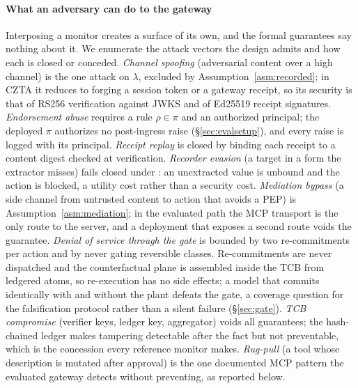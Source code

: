 \paragraph*{What an adversary can do to the gateway}
Interposing a monitor creates a surface of its own, and the formal
guarantees say nothing about it. We enumerate the attack vectors the
design admits and how each is closed or conceded.
\emph{Channel spoofing} (adversarial content over a high channel) is
the one attack on $\lambda$, excluded by Assumption~\ref{asm:recorded};
in CZTA it reduces to forging a session token or a gateway receipt, so
its security is that of RS256 verification against JWKS and of Ed25519
receipt signatures. \emph{Endorsement abuse} requires a rule
$\rho \in \pi$ and an authorized principal; the deployed $\pi$
authorizes no post-ingress raise (\S\ref{sec:evalsetup}), and every
raise is logged with its principal. \emph{Receipt replay} is closed by
binding each receipt to a content digest checked at verification.
\emph{Recorder evasion} (a target in a form the extractor misses) fails
closed under \Ifour: an unextracted value is unbound and the action is
blocked, a utility cost rather than a security cost. \emph{Mediation bypass} (a side channel from untrusted
content to action that avoids a PEP) is Assumption~\ref{asm:mediation};
in the evaluated path the MCP transport is the only route to the
server, and a deployment that exposes a second route voids the
guarantee. \emph{Denial of service through the gate} is bounded by two
re-commitments per action and by never gating reversible classes.
Re-commitments are never dispatched and the counterfactual plane is
assembled inside the TCB from ledgered atoms, so re-execution has no
side effects; a model that commits identically with and without the
plant defeats the gate, a coverage question for the falsification
protocol rather than a silent failure (\S\ref{sec:gate}). \emph{TCB compromise}
(verifier keys, ledger key, aggregator) voids all guarantees; the
hash-chained ledger makes tampering detectable after the fact but not
preventable, which is the concession every reference monitor makes.
\emph{Rug-pull} (a tool whose description is mutated after approval)
is the one documented MCP pattern the evaluated gateway detects without
preventing, as reported below.


